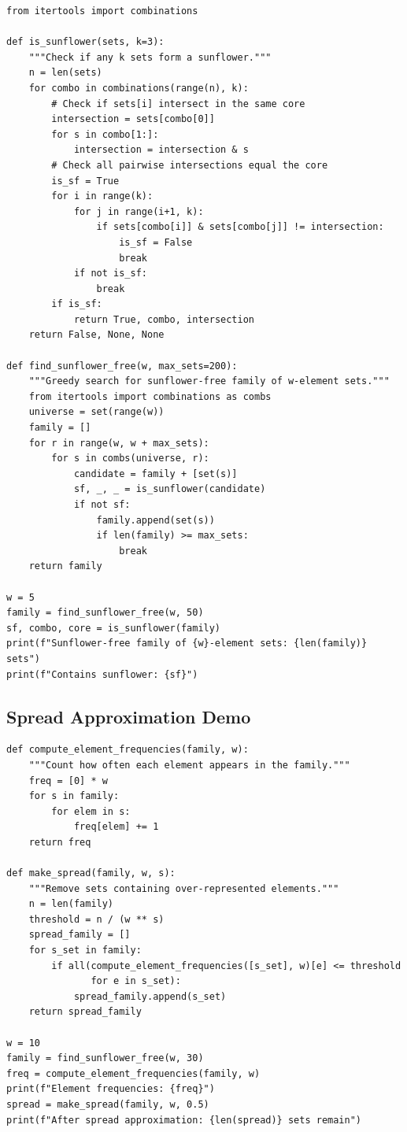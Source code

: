 \begin{verbatim}
from itertools import combinations

def is_sunflower(sets, k=3):
    """Check if any k sets form a sunflower."""
    n = len(sets)
    for combo in combinations(range(n), k):
        # Check if sets[i] intersect in the same core
        intersection = sets[combo[0]]
        for s in combo[1:]:
            intersection = intersection & s
        # Check all pairwise intersections equal the core
        is_sf = True
        for i in range(k):
            for j in range(i+1, k):
                if sets[combo[i]] & sets[combo[j]] != intersection:
                    is_sf = False
                    break
            if not is_sf:
                break
        if is_sf:
            return True, combo, intersection
    return False, None, None

def find_sunflower_free(w, max_sets=200):
    """Greedy search for sunflower-free family of w-element sets."""
    from itertools import combinations as combs
    universe = set(range(w))
    family = []
    for r in range(w, w + max_sets):
        for s in combs(universe, r):
            candidate = family + [set(s)]
            sf, _, _ = is_sunflower(candidate)
            if not sf:
                family.append(set(s))
                if len(family) >= max_sets:
                    break
    return family

w = 5
family = find_sunflower_free(w, 50)
sf, combo, core = is_sunflower(family)
print(f"Sunflower-free family of {w}-element sets: {len(family)} sets")
print(f"Contains sunflower: {sf}")
\end{verbatim}

\subsection{Spread Approximation Demo}

\begin{verbatim}
def compute_element_frequencies(family, w):
    """Count how often each element appears in the family."""
    freq = [0] * w
    for s in family:
        for elem in s:
            freq[elem] += 1
    return freq

def make_spread(family, w, s):
    """Remove sets containing over-represented elements."""
    n = len(family)
    threshold = n / (w ** s)
    spread_family = []
    for s_set in family:
        if all(compute_element_frequencies([s_set], w)[e] <= threshold
               for e in s_set):
            spread_family.append(s_set)
    return spread_family

w = 10
family = find_sunflower_free(w, 30)
freq = compute_element_frequencies(family, w)
print(f"Element frequencies: {freq}")
spread = make_spread(family, w, 0.5)
print(f"After spread approximation: {len(spread)} sets remain")
\end{verbatim}

